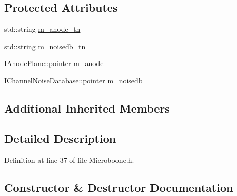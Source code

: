 \subsection*{Protected Attributes}
\begin{DoxyCompactItemize}
\item 
std\+::string \hyperlink{class_wire_cell_1_1_sig_proc_1_1_microboone_1_1_config_filter_base_ab4b3191871b0b4f11b43b14e10bde578}{m\+\_\+anode\+\_\+tn}
\item 
std\+::string \hyperlink{class_wire_cell_1_1_sig_proc_1_1_microboone_1_1_config_filter_base_a62a4e3cf2599f8fb215245a435fc1cba}{m\+\_\+noisedb\+\_\+tn}
\item 
\hyperlink{class_wire_cell_1_1_interface_a09c548fb8266cfa39afb2e74a4615c37}{I\+Anode\+Plane\+::pointer} \hyperlink{class_wire_cell_1_1_sig_proc_1_1_microboone_1_1_config_filter_base_a95e7c5116d032b4a55e7a9b6c4124020}{m\+\_\+anode}
\item 
\hyperlink{class_wire_cell_1_1_interface_a09c548fb8266cfa39afb2e74a4615c37}{I\+Channel\+Noise\+Database\+::pointer} \hyperlink{class_wire_cell_1_1_sig_proc_1_1_microboone_1_1_config_filter_base_af699e4eaf755a81d4436c5942da2a924}{m\+\_\+noisedb}
\end{DoxyCompactItemize}
\subsection*{Additional Inherited Members}


\subsection{Detailed Description}


Definition at line 37 of file Microboone.\+h.



\subsection{Constructor \& Destructor Documentation}
\mbox{\label{class_wire_cell_1_1_sig_proc_1_1_microboone_1_1_config_filter_base_af5f3172d8f68d3834970d590aa348cd8}} 

